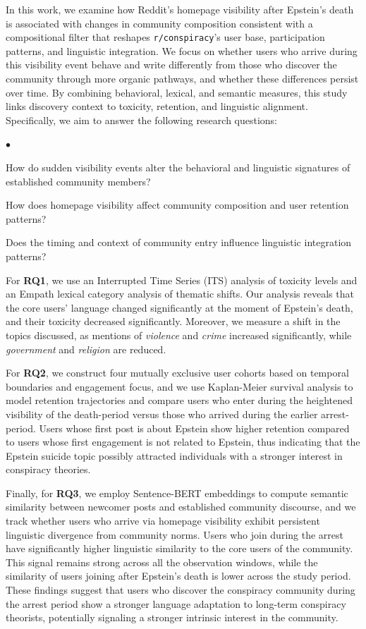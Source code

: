 \documentclass[letterpaper]{article} %
\newenvironment{squishlist}
{\begin{list}{$\bullet$}
{\setlength{\itemsep}{0pt}
\setlength{\parsep}{3pt}
\setlength{\topsep}{3pt}
\setlength{\partopsep}{0pt}
\setlength{\leftmargin}{1.5em}
\setlength{\labelwidth}{1em}
\setlength{\labelsep}{0.5em}}}
{\end{list}}
\begin{document}
In this work, we examine how Reddit's homepage visibility after Epstein's death is associated with changes in community composition consistent with a compositional filter that reshapes \texttt{r/conspiracy}'s user base, participation patterns, and linguistic integration. 
We focus on whether users who arrive during this visibility event behave and write differently from those who discover the community through more organic pathways, and whether these differences persist over time. 
By combining behavioral, lexical, and semantic measures, this study links discovery context to toxicity, retention, and linguistic alignment.
Specifically, we aim to answer the following research questions:

\begin{squishlist}
\item[\textbf{RQ1:}] How do sudden visibility events alter the behavioral and linguistic signatures of established community members?
\item[\textbf{RQ2:}] How does homepage visibility affect community composition and user retention patterns?
\item[\textbf{RQ3:}]Does the timing and context of community entry influence linguistic integration patterns?
\end{squishlist}

For \textbf{RQ1}, we use an Interrupted Time Series (ITS) analysis of toxicity levels and an Empath lexical category analysis of thematic shifts. 
Our analysis reveals that the core users' language changed significantly at the moment of Epstein's death, and their toxicity decreased significantly.
Moreover, we measure a shift in the topics discussed, as mentions of \textit{violence} and \textit{crime} increased significantly, while \textit{government} and \textit{religion} are reduced.  

For \textbf{RQ2}, we construct four mutually exclusive user cohorts based on temporal boundaries and engagement focus, and we use Kaplan-Meier survival analysis to model retention trajectories and compare users who enter during the heightened visibility of the death-period versus those who arrived during the earlier arrest-period.
Users whose first post is about Epstein show higher retention compared to users whose first engagement is not related to Epstein, thus indicating that the Epstein suicide topic possibly attracted individuals with a stronger interest in conspiracy theories.

Finally, for \textbf{RQ3}, we employ Sentence-BERT embeddings to compute semantic similarity between newcomer posts and established community discourse, and we track whether users who arrive via homepage visibility exhibit persistent linguistic divergence from community norms. 
Users who join during the arrest have significantly higher linguistic similarity to the core users of the community. 
This signal remains strong across all the observation windows, while the similarity of users joining after Epstein's death is lower across the study period.
These findings suggest that users who discover the conspiracy community during the arrest period show a stronger language adaptation to long-term conspiracy theorists, potentially signaling a stronger intrinsic interest in the community.
\end{document}

